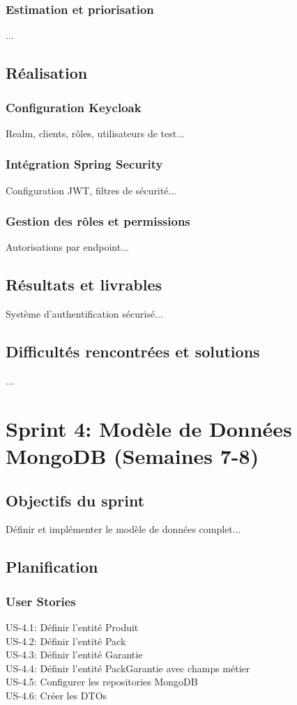 \documentclass[12pt,a4paper]{report}
\begin{document}
\subsubsection{Estimation et priorisation}
...

\subsection{Réalisation}
\subsubsection{Configuration Keycloak}
Realm, clients, rôles, utilisateurs de test...

\subsubsection{Intégration Spring Security}
Configuration JWT, filtres de sécurité...

\subsubsection{Gestion des rôles et permissions}
Autorisations par endpoint...

\subsection{Résultats et livrables}
Système d'authentification sécurisé...

\subsection{Difficultés rencontrées et solutions}
...

\section{Sprint 4: Modèle de Données MongoDB (Semaines 7-8)}
\subsection{Objectifs du sprint}
Définir et implémenter le modèle de données complet...

\subsection{Planification}
\subsubsection{User Stories}
US-4.1: Définir l'entité Produit \\
US-4.2: Définir l'entité Pack \\
US-4.3: Définir l'entité Garantie \\
US-4.4: Définir l'entité PackGarantie avec champs métier \\
US-4.5: Configurer les repositories MongoDB \\
US-4.6: Créer les DTOs
\end{document}
